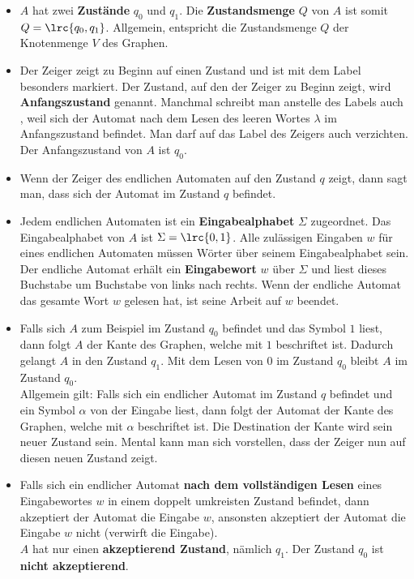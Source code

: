 \begin{itemize}
	\item $A$ hat zwei \textbf{Zustände} $q_0$ und $q_1$. Die \textbf{Zustandsmenge} $Q$ von $A$ ist somit $Q = \lrc{q_0,q_1}$. Allgemein, entspricht die Zustandsmenge $Q$ der Knotenmenge $V$ des Graphen.
	\item Der Zeiger zeigt zu Beginn auf einen Zustand und ist mit dem Label  besonders markiert. Der Zustand, auf den der Zeiger zu Beginn zeigt, wird \textbf{Anfangszustand} genannt. Manchmal schreibt man anstelle des Labels  auch \quotes{$\lambda$}, weil sich der Automat nach dem Lesen des leeren Wortes $\lambda$ im Anfangszustand befindet. Man darf auf das Label des Zeigers auch verzichten. Der Anfangszustand von $A$ ist $q_0$.
	\item Wenn der Zeiger des endlichen Automaten auf den Zustand $q$ zeigt, dann sagt man, dass sich der Automat im Zustand $q$ befindet.
	\item Jedem endlichen Automaten ist ein \textbf{Eingabealphabet} $\Sigma$ zugeordnet. Das Eingabealphabet von $A$ ist $\Sigma = \lrc{0,1}$. Alle zulässigen Eingaben $w$ für eines endlichen Automaten müssen Wörter über seinem Eingabealphabet sein. Der endliche Automat erhält ein \textbf{Eingabewort} $w$ über $\Sigma$ und liest dieses Buchstabe um Buchstabe von links nach rechts. Wenn der endliche Automat das gesamte Wort $w$ gelesen hat, ist seine Arbeit auf $w$ beendet.
	\item Falls sich $A$ zum Beispiel im Zustand $q_0$ befindet und das Symbol $1$ liest, dann folgt $A$ der Kante des Graphen, welche mit $1$ beschriftet ist. Dadurch gelangt $A$ in den Zustand $q_1$. Mit dem Lesen von $0$ im Zustand $q_0$ bleibt $A$ im Zustand $q_0$.\\
	      Allgemein gilt: Falls sich ein endlicher Automat im Zustand $q$ befindet und ein Symbol $\alpha$ von der Eingabe liest, dann folgt der Automat der Kante des Graphen, welche mit $\alpha$ beschriftet ist. Die Destination der Kante wird sein neuer Zustand sein. Mental kann man sich vorstellen, dass der Zeiger nun auf diesen neuen Zustand zeigt.
	\item Falls sich ein endlicher Automat \textbf{nach dem vollständigen Lesen} eines Eingabewortes $w$ in einem doppelt umkreisten Zustand befindet, dann akzeptiert der Automat die Eingabe $w$, ansonsten akzeptiert der Automat die Eingabe $w$ nicht (verwirft die Eingabe).\\
	      $A$ hat nur einen \textbf{akzeptierend Zustand}, nämlich $q_1$. Der Zustand $q_0$ ist \textbf{nicht akzeptierend}.
\end{itemize}
